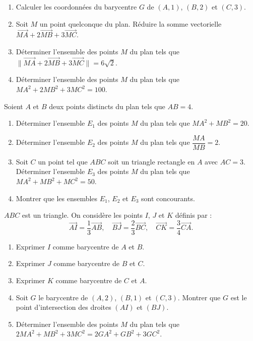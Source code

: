 \begin{enumerate}[label=\arabic*)]
\item Calculer les coordonnées du barycentre $G$ de $(A,1)$, $(B,2)$ et $(C,3)$.
\item Soit $M$ un point quelconque du plan. Réduire la somme vectorielle $\overrightarrow{MA} + 2\overrightarrow{MB} + 3\overrightarrow{MC}$.
\item Déterminer l'ensemble des points $M$ du plan tels que $\|\overrightarrow{MA} + 2\overrightarrow{MB} + 3\overrightarrow{MC}\| = 6\sqrt{2}$.
\item Déterminer l'ensemble des points $M$ du plan tels que $MA^2 + 2MB^2 + 3MC^2 = 100$.
\end{enumerate}

\label{prob:2}
Soient $A$ et $B$ deux points distincts du plan tels que $AB = 4$.

\begin{enumerate}[label=\arabic*)]
\item Déterminer l'ensemble $E_1$ des points $M$ du plan tels que $MA^2 + MB^2 = 20$.
\item Déterminer l'ensemble $E_2$ des points $M$ du plan tels que $\dfrac{MA}{MB} = 2$.
\item Soit $C$ un point tel que $ABC$ soit un triangle rectangle en $A$ avec $AC = 3$. Déterminer l'ensemble $E_3$ des points $M$ du plan tels que $MA^2 + MB^2 + MC^2 = 50$.
\item Montrer que les ensembles $E_1$, $E_2$ et $E_3$ sont concourants.
\end{enumerate}

\label{prob:3}
$ABC$ est un triangle. On considère les points $I$, $J$ et $K$ définis par :
\[
\overrightarrow{AI} = \dfrac{1}{3}\overrightarrow{AB}, \quad \overrightarrow{BJ} = \dfrac{2}{3}\overrightarrow{BC}, \quad \overrightarrow{CK} = \dfrac{3}{4}\overrightarrow{CA}.
\]

\begin{enumerate}[label=\arabic*)]
\item Exprimer $I$ comme barycentre de $A$ et $B$.
\item Exprimer $J$ comme barycentre de $B$ et $C$.
\item Exprimer $K$ comme barycentre de $C$ et $A$.
\item Soit $G$ le barycentre de $(A,2)$, $(B,1)$ et $(C,3)$. Montrer que $G$ est le point d'intersection des droites $(AI)$ et $(BJ)$.
\item Déterminer l'ensemble des points $M$ du plan tels que $2MA^2 + MB^2 + 3MC^2 = 2GA^2 + GB^2 + 3GC^2$.
\end{enumerate}


